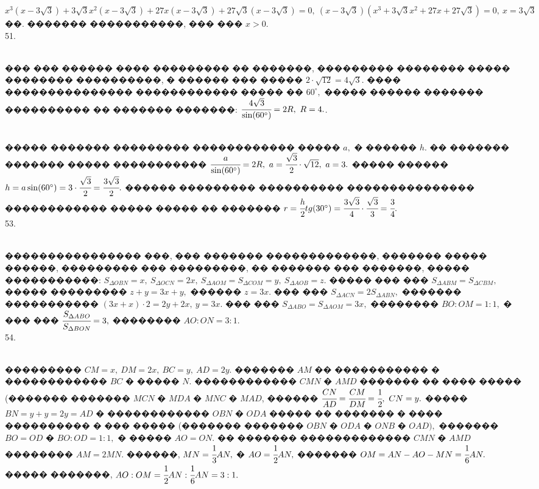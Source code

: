 \documentclass[12pt]{article}
\begin{document}
$x^3(x-3\sqrt{3})+3\sqrt{3}x^2(x-3\sqrt{3})+27x(x-3\sqrt{3})+27\sqrt{3}(x-3\sqrt{3})=0,\ (x-3\sqrt{3})(x^3+3\sqrt{3}x^2+27x+27\sqrt{3})=0,\ x=3\sqrt{3}$��. ������� �����������, ��� ��� $x>0.$\\
51. \begin{figure}[ht!]
\end{figure}\\
��� ��� ������ ���� ��������� �� �������, ��������� �������� ����� �������� ����������, � ������ ��� ����� $2\cdot\sqrt{12}=4\sqrt{3}.$ ���� ��������������� ������������ ����� �� $60^\circ,$ ����� ������ ������� ���������� �� ������� �������: $\cfrac{4\sqrt{3}}{\sin(60^\circ)}=2R,\ R=4.$\newpage{}. \begin{figure}[ht!]
\end{figure}\\
����� ������� ��������� ������������ ����� $a,$ � ������ $h.$ �� ������� ������� ����� ����������� $\cfrac{a}{\sin(60^\circ)}=2R,\ a=\cfrac{\sqrt{3}}{2}\cdot\sqrt{12},\ a=3.$ ����� ������ $h=a\sin(60^\circ)=3\cdot\cfrac{\sqrt{3}}{2}=\cfrac{3\sqrt{3}}{2}.$ ������ ��������� ���������� ��������������� ������������ ����� ����� �� ������� $r=\cfrac{h}{2}tg(30^\circ)=\cfrac{3\sqrt{3}}{4}\cdot\cfrac{\sqrt{3}}{3}=\cfrac{3}{4}.$\\
53. \begin{figure}[ht!]
\end{figure}\\
���������������� ���, ��� ������� �������������, ������� ����� ������, ��������� ��� ���������, �� ������� ��� �������, ����� �����������: $S_{\Delta OBN}=x,\ S_{\Delta OCN}=2x,\ S_{\Delta AOM}=S_{\Delta COM}=y,\ S_{\Delta AOB}=z.$ ����� ��� ��� $S_{\Delta ABM}=S_{\Delta CBM},$ ����� ��������� $z+y=3x+y,$ ������ $z=3x.$ ��� ��� $S_{\Delta ACN}=2S_{\Delta ABN},$ ������� ����������� $(3x+x)\cdot2=2y+2x,\ y=3x.$ ��� ��� $S_{\Delta ABO}=S_{\Delta AOM}=3x,$ �������� $BO:OM=1:1,$ � ��� ��� $\cfrac{S_{\Delta ABO}}{S_{\Delta BON}}=3,$ �������� $AO:ON=3:1.$\\
54. \begin{figure}[ht!]
\end{figure}\\
��������� $CM=x,\ DM=2x,\ BC=y,\ AD=2y.$ ������� $AM$ �� ����������� � ������������ $BC$ � ����� $N.$ ������������ $CMN$ � $AMD$ ������� �� ���� ����� (������� �������  $MCN$ � $MDA$ � $MNC$ � $MAD$, ������ $\cfrac{CN}{AD}=\cfrac{CM}{DM}=\cfrac{1}{2},\ CN=y.$ ����� $BN=y+y=2y=AD$ � ������������ $OBN$ � $ODA$ ����� �� ������� � ���� ���������� � ��� ����� (������� ������� $OBN$ � $ODA$ � $ONB$ � $OAD),$ ������� $BO=OD$ � $BO:OD=1:1,$ � ����� $AO=ON.$ �� ������� ������������� $CMN$ � $AMD$ �������� $AM=2MN.$ ������, $MN=\cfrac{1}{3}AN,$ � $AO=\cfrac{1}{2}AN,$ ������� $OM=AN-AO-MN=\cfrac{1}{6}AN.$ ����� �������, $AO:OM=\cfrac{1}{2}AN:\cfrac{1}{6}AN=3:1.$\\
\end{document}

